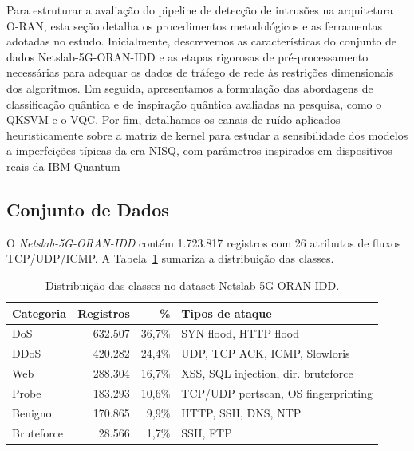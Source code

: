 \documentclass[12pt]{article}
\begin{document}
Para estruturar a avaliação do pipeline de detecção de intrusões na arquitetura O-RAN, esta seção detalha os procedimentos metodológicos e as ferramentas adotadas no estudo. Inicialmente, descrevemos as características do conjunto de dados Netslab-5G-ORAN-IDD e as etapas rigorosas de pré-processamento necessárias para adequar os dados de tráfego de rede às restrições dimensionais dos algoritmos. Em seguida, apresentamos a formulação das abordagens de classificação quântica e de inspiração quântica avaliadas na pesquisa, como o QKSVM e o VQC. Por fim, detalhamos os canais de ruído aplicados heuristicamente sobre a matriz de kernel para estudar a sensibilidade dos modelos a imperfeições típicas da era NISQ, com parâmetros inspirados em dispositivos reais da IBM Quantum


\subsection{Conjunto de Dados}

O \textit{Netslab-5G-ORAN-IDD} contém 1.723.817 registros com 26 atributos de fluxos TCP/UDP/ICMP. A Tabela~\ref{tab:dataset} sumariza a distribuição das classes.

\begin{table}[H]
\centering
\caption{Distribuição das classes no dataset Netslab-5G-ORAN-IDD.}
\label{tab:dataset}
\small
\begin{tabular}{lrrl}
\toprule
\textbf{Categoria} & \textbf{Registros} & \textbf{\%} & \textbf{Tipos de ataque} \\
\midrule
DoS        & 632.507 & 36,7\% & SYN flood, HTTP flood \\
DDoS       & 420.282 & 24,4\% & UDP, TCP ACK, ICMP, Slowloris \\
Web        & 288.304 & 16,7\% & XSS, SQL injection, dir. bruteforce \\
Probe      & 183.293 & 10,6\% & TCP/UDP portscan, OS fingerprinting \\
Benigno    & 170.865 &  9,9\% & HTTP, SSH, DNS, NTP \\
Bruteforce &  28.566 &  1,7\% & SSH, FTP \\
\bottomrule
\end{tabular}
\end{table}
\end{document}
